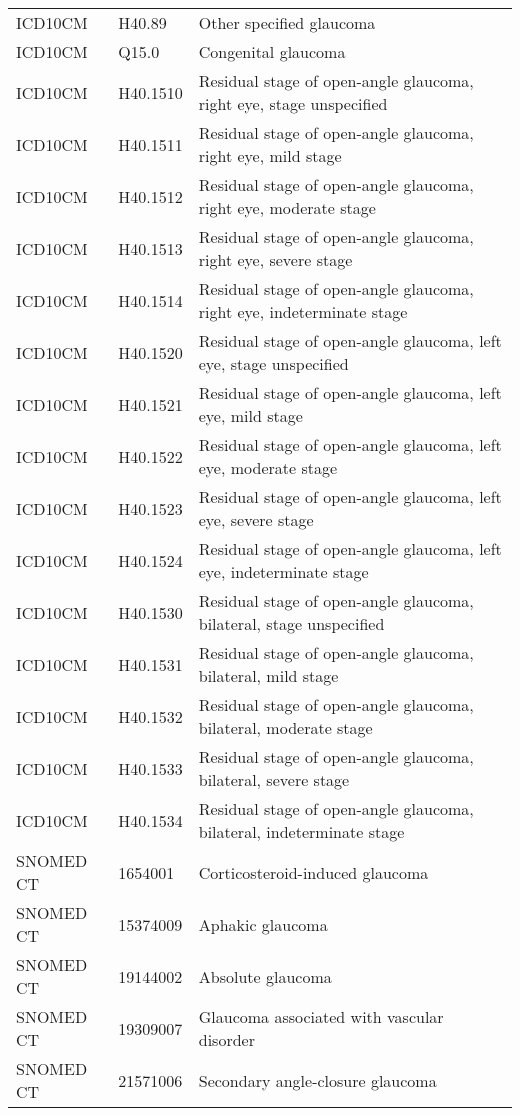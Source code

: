 \begin{longtable}{p{}p{}p{}}
  ICD10CM & H40.89 & Other specified glaucoma \\ 
  ICD10CM & Q15.0 & Congenital glaucoma \\ 
  ICD10CM & H40.1510 & Residual stage of open-angle glaucoma, right eye, stage unspecified \\ 
  ICD10CM & H40.1511 & Residual stage of open-angle glaucoma, right eye, mild stage \\ 
  ICD10CM & H40.1512 & Residual stage of open-angle glaucoma, right eye, moderate stage \\ 
  ICD10CM & H40.1513 & Residual stage of open-angle glaucoma, right eye, severe stage \\ 
  ICD10CM & H40.1514 & Residual stage of open-angle glaucoma, right eye, indeterminate stage \\ 
  ICD10CM & H40.1520 & Residual stage of open-angle glaucoma, left eye, stage unspecified \\ 
  ICD10CM & H40.1521 & Residual stage of open-angle glaucoma, left eye, mild stage \\ 
  ICD10CM & H40.1522 & Residual stage of open-angle glaucoma, left eye, moderate stage \\ 
  ICD10CM & H40.1523 & Residual stage of open-angle glaucoma, left eye, severe stage \\ 
  ICD10CM & H40.1524 & Residual stage of open-angle glaucoma, left eye, indeterminate stage \\ 
  ICD10CM & H40.1530 & Residual stage of open-angle glaucoma, bilateral, stage unspecified \\ 
  ICD10CM & H40.1531 & Residual stage of open-angle glaucoma, bilateral, mild stage \\ 
  ICD10CM & H40.1532 & Residual stage of open-angle glaucoma, bilateral, moderate stage \\ 
  ICD10CM & H40.1533 & Residual stage of open-angle glaucoma, bilateral, severe stage \\ 
  ICD10CM & H40.1534 & Residual stage of open-angle glaucoma, bilateral, indeterminate stage \\ 
  SNOMED CT & 1654001 & Corticosteroid-induced glaucoma \\ 
  SNOMED CT & 15374009 & Aphakic glaucoma \\ 
  SNOMED CT & 19144002 & Absolute glaucoma \\ 
  SNOMED CT & 19309007 & Glaucoma associated with vascular disorder \\ 
  SNOMED CT & 21571006 & Secondary angle-closure glaucoma \\ 

\end{longtable}
